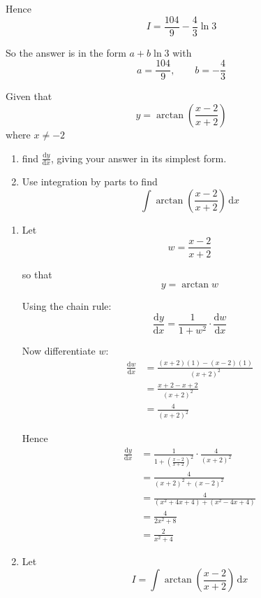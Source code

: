 \documentclass[leqno]{article}
\begin{document}
\begin{enumerate}[
  label=\textbf{\arabic*.},
  leftmargin=*,
  topsep=0pt,
  partopsep=0pt,
  parsep=0pt
]
\begin{djsSolution}
Hence
\[
I=\frac{104}{9}-\frac{4}{3}\ln 3
\]

So the answer is in the form $a+b\ln 3$ with
\[
a=\frac{104}{9}, \qquad b=-\frac{4}{3}
\]
\end{djsSolution}


\newpage

\questionitem

Given that
\[
y = \arctan\left(\frac{x-2}{x+2}\right)
\]
where $x\ne -2$ \\
\begin{enumerate}[label=\textbf{(\alph*)}]
  \item find $\frac{\mathrm{d}y}{\mathrm{d}x}$, giving your answer in its simplest form.  \\
  \item Use integration by parts to find
  \[
  \int \arctan\left(\frac{x-2}{x+2}\right)\,\mathrm{d}x
  \]
\end{enumerate}

\vspace*{10pt}

\begin{djsSolution}
\begin{enumerate}[label=\textbf{(\alph*)}]
  \item Let
\[
w=\frac{x-2}{x+2}
\]

so that
\[
y=\arctan w
\]

Using the chain rule:
\[
\frac{\mathrm{d}y}{\mathrm{d}x}=\frac{1}{1+w^2}\cdot \frac{\mathrm{d}w}{\mathrm{d}x}
\]

Now differentiate $w$:
\begin{align*}
\frac{\mathrm{d}w}{\mathrm{d}x}
&=\frac{(x+2)(1)-(x-2)(1)}{(x+2)^2} \\
&=\frac{x+2-x+2}{(x+2)^2} \\
&=\frac{4}{(x+2)^2}
\end{align*}

Hence
\begin{align*}
\frac{\mathrm{d}y}{\mathrm{d}x}
&=\frac{1}{1+\left(\frac{x-2}{x+2}\right)^2}\cdot \frac{4}{(x+2)^2} \\
&=\frac{4}{(x+2)^2+(x-2)^2} \\
&=\frac{4}{(x^2+4x+4)+(x^2-4x+4)} \\
&=\frac{4}{2x^2+8} \\
&=\frac{2}{x^2+4}
\end{align*}

  \item Let
\[
I=\int \arctan\left(\frac{x-2}{x+2}\right)\,\mathrm{d}x
\]


\end{enumerate}
\end{djsSolution}
\end{enumerate}
\end{document}
